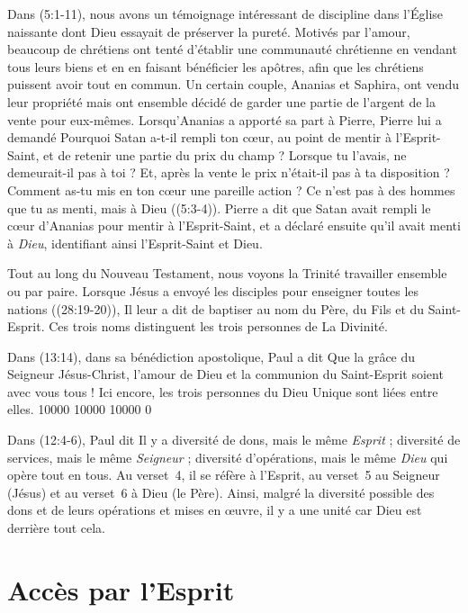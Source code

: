 Dans (5:1-11), nous avons un témoignage intéressant de
 discipline dans l'Église naissante dont Dieu essayait de préserver
 la pureté.
 Motivés par l'amour, beaucoup de chrétiens ont tenté d'établir une
 communauté chrétienne en vendant tous leurs biens et en en faisant
 bénéficier les apôtres, afin que les chrétiens puissent avoir tout en
 commun. Un certain couple, Ananias et Saphira, ont vendu leur
 propriété mais ont ensemble décidé de garder une partie de l'argent de la vente pour
 eux-mêmes. Lorsqu'Ananias a apporté sa part à Pierre, Pierre lui a
 demandé\frcolon{} \Og Pourquoi Satan a-t-il rempli ton cœur, au point de mentir
 à l'Esprit-Saint, et de retenir une partie du prix du champ ? Lorsque tu
 l'avais, ne demeurait-il pas à toi ? Et, après la vente le prix n'était-il
 pas à ta disposition ?
 Comment as-tu mis en ton cœur une pareille action ?
 Ce n'est pas à des hommes que tu as menti, mais à Dieu \Fg{}
 ((5:3-4)).  
 Pierre a dit que Satan avait rempli le cœur d'Ananias pour mentir
 à l'Esprit-Saint, et a déclaré ensuite qu'il avait menti à \emph{Dieu}, identifiant
 ainsi l'Esprit-Saint et Dieu.

Tout au long du Nouveau Testament, nous voyons la Trinité travailler ensemble
 ou par paire. Lorsque Jésus a envoyé les disciples pour enseigner toutes
 les nations ((28:19-20)), Il leur a dit de baptiser au nom
 du Père, du Fils et du Saint-Esprit. Ces trois noms distinguent les trois
 personnes de La Divinité.

Dans (13:14), dans sa bénédiction apostolique, Paul a dit\frcolon{}
 \Og Que la grâce du Seigneur Jésus-Christ, l'amour de Dieu et la communion
 du Saint-Esprit soient avec vous tous ! \Fg{}
 Ici encore, les trois personnes du Dieu Unique sont liées entre elles.
 \begingroup{} 10000 10000 10000 0
 \par\endgroup

Dans (12:4-6), Paul dit\frcolon{}
 \Og Il y a diversité de dons, mais le même \emph{Esprit} ; diversité de services,
 mais le même \emph{Seigneur} ; diversité d'opérations, mais le
 même \emph{Dieu} qui opère tout en tous. \Fg{}
 Au verset~4, il se réfère à l'Esprit,
 au verset~5 au Seigneur (Jésus)
 et au verset~6 à Dieu (le Père).
 Ainsi, malgré la diversité possible des dons et de leurs opérations
 et mises en \oe{}uvre, il y a une unité car Dieu est derrière tout cela.


\section{Acc\`es par l'Esprit}

